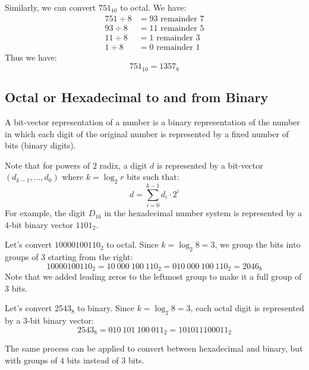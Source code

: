 \begin{eg}
    Similarly, we can convert $751_{10}$ to octal. We have:
    \begin{align*}
        751 \div 8 &= 93 \text{ remainder } 7 \\
        93 \div 8 &= 11 \text{ remainder } 5 \\
        11 \div 8 &= 1 \text{ remainder } 3 \\
        1 \div 8 &= 0 \text{ remainder } 1
    \end{align*}
    Thus we have:
    \[
        751_{10} = 1357_8
    \]
\end{eg}

\subsection{Octal or Hexadecimal to and from Binary}
\begin{definition}
    A bit-vector representation of a number is a binary representation of the number in which each digit of the original number is represented by a fixed number of bits (binary digits).
\end{definition}
Note that for powers of $2$ radix, a digit $d$ is represented by a bit-vector $(d_{k -1}, \ldots, d_0)$ where $k = \log_2 r$ bits such that:
\[
    d = \sum_{i = 0}^{k - 1} d_i \cdot 2^i
\]
For example, the digit $D_{16}$ in the hexadecimal number system is represented by a $4$-bit binary vector $1101_2$.

\begin{eg}
    Let's convert $10000100110_2$ to octal. Since $k = \log_2 8 = 3$, we group the bits into groups of $3$ starting from the right:
    \[
        10000100110_2 = 10 \ 000 \ 100 \ 110_2 = 010 \ 000 \ 100 \ 110_2 = 2046_8
    \]
    Note that we added leading zeros to the leftmost group to make it a full group of $3$ bits.
\end{eg}

\begin{eg}
    Let's convert $2543_8$ to binary. Since $k = \log_2 8 = 3$, each octal digit is represented by a $3$-bit binary vector:
    \[
        2543_8 = 010 \ 101 \ 100 \ 011_2 = 101011100011_2
    \]
\end{eg}
The same process can be applied to convert between hexadecimal and binary, but with groups of $4$ bits instead of $3$ bits.

